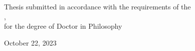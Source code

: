 \begin{titlepage}
\begin{center}
\vspace{1.5cm}

\vfill

\large {Thesis submitted in accordance with the requirements of the\\}
\univname, \deptname \\
\large {for the degree of Doctor in Philosophy}

\vfill

{\large October 22, 2023}\\[4.5cm] %

\vfill
\end{center}
\end{titlepage}
